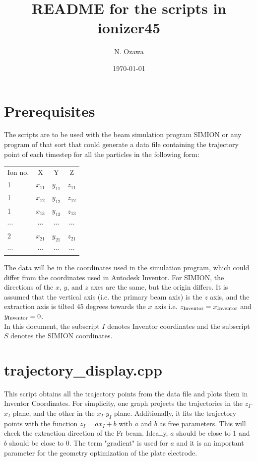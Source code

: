 \documentclass{article}
\title{README for the scripts in ionizer45}
\author{N. Ozawa}
\date{\today}
\begin{document}
\maketitle

\section{Prerequisites}
The scripts are to be used with the beam simulation program SIMION or any program of that sort that could generate a data file containing the trajectory point of each timestep for all the particles in the following form:
\begin{table}[H]
  \begin{tabular}{lccc}
    Ion no. & X & Y & Z \\
    1 & $x_{11}$ & $y_{11}$ & $z_{11}$ \\
    1 & $x_{12}$ & $y_{12}$ & $z_{12}$ \\
    1 & $x_{13}$ & $y_{13}$ & $z_{13}$ \\
    $\cdots$ & $\cdots$ & $\cdots$ & $\cdots$ \\
    2 & $x_{21}$ & $y_{21}$ & $z_{21}$ \\
    $\cdots$ & $\cdots$ & $\cdots$ & $\cdots$
  \end{tabular}
\end{table}
The data will be in the coordinates used in the simulation program, which could differ from the coordinates used in Autodesk Inventor. For SIMION, the directions of the $x$, $y$, and $z$ axes are the same, but the origin differs. It is assumed that the vertical axis (i.e. the primary beam axis) is the $z$ axis, and the extraction axis is tilted 45 degrees towards the $x$ axis i.e. $z_{{\rm Inventor}} = x_{{\rm Inventor}}$ and $y_{{\rm Inventor}} = 0$. \\

In this document, the subscript $I$ denotes Inventor coordinates and the subscript $S$ denotes the SIMION coordinates.


\section{trajectory\_display.cpp}
This script obtains all the trajectory points from the data file and plots them in Inventor Coordinates. For simplicity, one graph projects the trajectories in the $z_I$-$x_I$ plane, and the other in the $x_I$-$y_I$ plane. Additionally, it fits the trajectory points with the function $z_I = ax_I + b$ with $a$ and $b$ as free parameters. This will check the extraction direction of the Fr beam. Ideally, $a$ should be close to 1 and $b$ should be close to 0. The term "gradient" is used for $a$ and it is an important parameter for the geometry optimization of the plate electrode.
\end{document}
